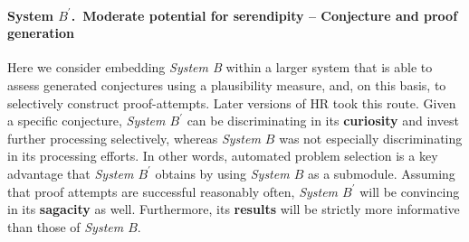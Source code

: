 \paragraph{System $B^{\prime}$.~Moderate potential for serendipity -- Conjecture and proof generation}

Here we consider embedding \emph{System B} within a larger system that
is able to assess generated conjectures using a plausibility measure,
and, on this basis, to selectively construct proof-attempts.  Later
versions of {\sf HR} took this route.  Given a specific conjecture,
\emph{System $B^{\prime}$} can be discriminating in its
\textbf{curiosity} and invest further processing selectively, whereas
\emph{System $B$} was not especially discriminating in its processing
efforts.  In other words, automated problem selection is a key
advantage that \emph{System $B^{\prime}$} obtains by using
\emph{System $B$} as a submodule.  Assuming that proof attempts are
successful reasonably often, \emph{System $B^{\prime}$} will be
convincing in its \textbf{sagacity} as well.  Furthermore, its
\textbf{results} will be strictly more informative than those of
\emph{System $B$}.

